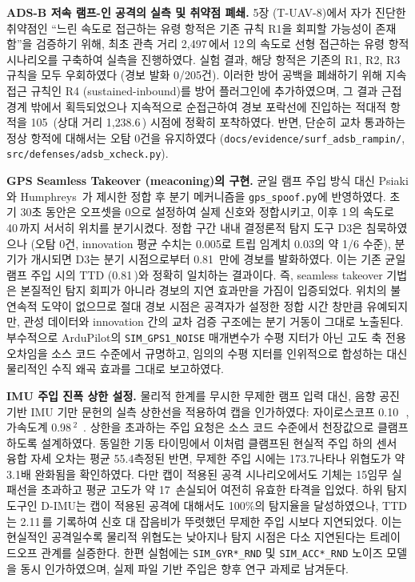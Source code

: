 \textbf{ADS-B 저속 램프-인 공격의 실측 및 취약점 폐쇄.} 5장 (T-UAV-8)에서 자가 진단한 취약점인 ``느린 속도로 접근하는 유령 항적은 기존 규칙 R1을 회피할 가능성이 존재함''을 검증하기 위해, 최초 관측 거리 2{,}497\,에서 12\,의 속도로 선형 접근하는 유령 항적 시나리오를 구축하여 실측을 진행하였다. 실험 결과, 해당 항적은 기존의 R1, R2, R3 규칙을 모두 우회하였다 (경보 발화 0/205건). 이러한 방어 공백을 폐쇄하기 위해 지속 접근 규칙인 R4 (sustained-inbound)를 방어 플러그인에 추가하였으며, 그 결과 근접 경계 밖에서 획득되었으나 지속적으로 순접근하여 경보 포락선에 진입하는 적대적 항적을 105\, (상대 거리 1{,}238.6\,) 시점에 정확히 포착하였다. 반면, 단순히 교차 통과하는 정상 항적에 대해서는 오탐 0건을 유지하였다 (\texttt{docs/evidence/surf\_adsb\_rampin/}, \texttt{src/defenses/adsb\_xcheck.py}).

\textbf{GPS Seamless Takeover (meaconing)의 구현.} 균일 램프 주입 방식 대신 Psiaki와 Humphreys~\cite{psiaki_humphreys_2016}가 제시한 정합 후 분기 메커니즘을 \texttt{gps\_spoof.py}에 반영하였다. 초기 30초 동안은 오프셋을 0으로 설정하여 실제 신호와 정합시키고, 이후 1\,의 속도로 40\,까지 서서히 위치를 분기시켰다. 정합 구간 내내 결정론적 탐지 도구 D3은 침묵하였으나 (오탐 0건, innovation 평균 수치는 0.005로 트립 임계치 0.03의 약 1/6 수준), 분기가 개시되면 D3는 분기 시점으로부터 0.81\, 만에 경보를 발화하였다. 이는 기존 균일 램프 주입 시의 TTD (0.81\,)와 정확히 일치하는 결과이다. 즉, seamless takeover 기법은 본질적인 탐지 회피가 아니라 경보의 지연 효과만을 가짐이 입증되었다. 위치의 불연속적 도약이 없으므로 절대 경보 시점은 공격자가 설정한 정합 시간 창만큼 유예되지만, 관성 데이터와 innovation 간의 교차 검증 구조에는 분기 거동이 그대로 노출된다. 부수적으로 ArduPilot의 \texttt{SIM\_GPS1\_NOISE} 매개변수가 수평 지터가 아닌 고도 축 전용 오차임을 소스 코드 수준에서 규명하고, 임의의 수평 지터를 인위적으로 합성하는 대신 물리적인 수직 왜곡 효과를 그대로 보고하였다.

\textbf{IMU 주입 진폭 상한 설정.} 물리적 한계를 무시한 무제한 램프 입력 대신, 음향 공진 기반 IMU 기만 문헌의 실측 상한선을 적용하여 캡을 인가하였다: 자이로스코프 0.10\,~\cite{tu2018injected}, 가속도계 0.98\,$^2$~\cite{trippel2017walnut}. 상한을 초과하는 주입 요청은 소스 코드 수준에서 천장값으로 클램프하도록 설계하였다. 동일한 기동 타이밍에서 이처럼 클램프된 현실적 주입 하의 센서 융합 자세 오차는 평균 55.4 측정된 반면, 무제한 주입 시에는 173.7 나타나 위협도가 약 3.1배 완화됨을 확인하였다. 다만 캡이 적용된 공격 시나리오에서도 기체는 15 임무 실패선을 초과하고 평균 고도가 약 17\, 손실되어 여전히 유효한 타격을 입었다. 하위 탐지 도구인 D-IMU는 캡이 적용된 공격에 대해서도 100\%의 탐지율을 달성하였으나, TTD는 2.11\,를 기록하여 신호 대 잡음비가 뚜렷했던 무제한 주입 시보다 지연되었다. 이는 현실적인 공격일수록 물리적 위협도는 낮아지나 탐지 시점은 다소 지연된다는 트레이드오프 관계를 실증한다. 한편 실험에는 \texttt{SIM\_GYR*\_RND} 및 \texttt{SIM\_ACC*\_RND} 노이즈 모델을 동시 인가하였으며, 실제 파일 기반 주입은 향후 연구 과제로 남겨둔다.

